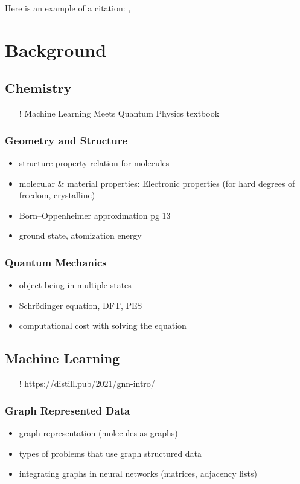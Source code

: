 \documentclass[12pt]{scrartcl}
\begin{document}
Here is an example of a citation: \cite{gap20}, \cite{DGL}

\newpage

\section{Background}

\subsection{Chemistry}
\begin{itemize}
    \item[!] Machine Learning Meets Quantum Physics textbook
\end{itemize}
\subsubsection{Geometry and Structure}
\begin{itemize}
  \item structure property relation for molecules
  \item molecular \& material properties: Electronic properties (for hard degrees of freedom, crystalline)
  \item Born–Oppenheimer approximation pg 13  
  \item ground state, atomization energy
\end{itemize}

\subsubsection{Quantum Mechanics}
\begin{itemize}
    \item object being in multiple states
    \item Schrödinger equation, DFT, PES
    \item computational cost with solving the equation
\end{itemize}

\newpage


\subsection{Machine Learning}
\begin{itemize}
    \item[!] https://distill.pub/2021/gnn-intro/
\end{itemize}
\subsubsection{Graph Represented Data}
\begin{itemize}
    \item graph representation (molecules as graphs)
    \item types of problems that use graph structured data 
    \item integrating graphs in neural networks (matrices, adjacency lists)
\end{itemize}
\end{document}
